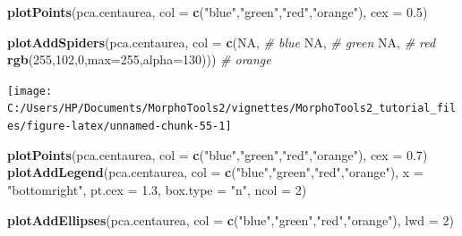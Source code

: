 \documentclass[
]{article}
\newenvironment{Shaded}{\begin{snugshade}}{\end{snugshade}}
\newcommand{\CommentTok}[1]{\textcolor[rgb]{0.56,0.35,0.01}{\textit{#1}}}
\newcommand{\DataTypeTok}[1]{\textcolor[rgb]{0.13,0.29,0.53}{#1}}
\newcommand{\DecValTok}[1]{\textcolor[rgb]{0.00,0.00,0.81}{#1}}
\newcommand{\FloatTok}[1]{\textcolor[rgb]{0.00,0.00,0.81}{#1}}
\newcommand{\KeywordTok}[1]{\textcolor[rgb]{0.13,0.29,0.53}{\textbf{#1}}}
\newcommand{\NormalTok}[1]{#1}
\newcommand{\OtherTok}[1]{\textcolor[rgb]{0.56,0.35,0.01}{#1}}
\newcommand{\StringTok}[1]{\textcolor[rgb]{0.31,0.60,0.02}{#1}}
\begin{document}
\begin{Shaded}
\begin{Highlighting}[]
\KeywordTok{plotPoints}\NormalTok{(pca.centaurea, }\DataTypeTok{col =} \KeywordTok{c}\NormalTok{(}\StringTok{"blue"}\NormalTok{,}\StringTok{"green"}\NormalTok{,}\StringTok{"red"}\NormalTok{,}\StringTok{"orange"}\NormalTok{), }\DataTypeTok{cex =} \FloatTok{0.5}\NormalTok{)}

\KeywordTok{plotAddSpiders}\NormalTok{(pca.centaurea, }\DataTypeTok{col =} \KeywordTok{c}\NormalTok{(}\OtherTok{NA}\NormalTok{, }\CommentTok{# blue}
                                      \OtherTok{NA}\NormalTok{, }\CommentTok{# green}
                                      \OtherTok{NA}\NormalTok{, }\CommentTok{# red}
                                      \KeywordTok{rgb}\NormalTok{(}\DecValTok{255}\NormalTok{,}\DecValTok{102}\NormalTok{,}\DecValTok{0}\NormalTok{,}\DataTypeTok{max=}\DecValTok{255}\NormalTok{,}\DataTypeTok{alpha=}\DecValTok{130}\NormalTok{))) }\CommentTok{# orange}
\end{Highlighting}
\end{Shaded}

\begin{center}\texttt{[image: C:/Users/HP/Documents/MorphoTools2/vignettes/MorphoTools2\_tutorial\_files/figure-latex/unnamed-chunk-55-1]} \end{center}

\begin{Shaded}
\begin{Highlighting}[]
\KeywordTok{plotPoints}\NormalTok{(pca.centaurea, }\DataTypeTok{col =} \KeywordTok{c}\NormalTok{(}\StringTok{"blue"}\NormalTok{,}\StringTok{"green"}\NormalTok{,}\StringTok{"red"}\NormalTok{,}\StringTok{"orange"}\NormalTok{), }\DataTypeTok{cex =} \FloatTok{0.7}\NormalTok{)}
\KeywordTok{plotAddLegend}\NormalTok{(pca.centaurea, }\DataTypeTok{col =} \KeywordTok{c}\NormalTok{(}\StringTok{"blue"}\NormalTok{,}\StringTok{"green"}\NormalTok{,}\StringTok{"red"}\NormalTok{,}\StringTok{"orange"}\NormalTok{), }
               \DataTypeTok{x =} \StringTok{"bottomright"}\NormalTok{, }\DataTypeTok{pt.cex =} \FloatTok{1.3}\NormalTok{, }\DataTypeTok{box.type =} \StringTok{"n"}\NormalTok{, }\DataTypeTok{ncol =} \DecValTok{2}\NormalTok{)}

\KeywordTok{plotAddEllipses}\NormalTok{(pca.centaurea, }\DataTypeTok{col =} \KeywordTok{c}\NormalTok{(}\StringTok{"blue"}\NormalTok{,}\StringTok{"green"}\NormalTok{,}\StringTok{"red"}\NormalTok{,}\StringTok{"orange"}\NormalTok{), }\DataTypeTok{lwd =} \DecValTok{2}\NormalTok{)}
\end{Highlighting}
\end{Shaded}
\end{document}
